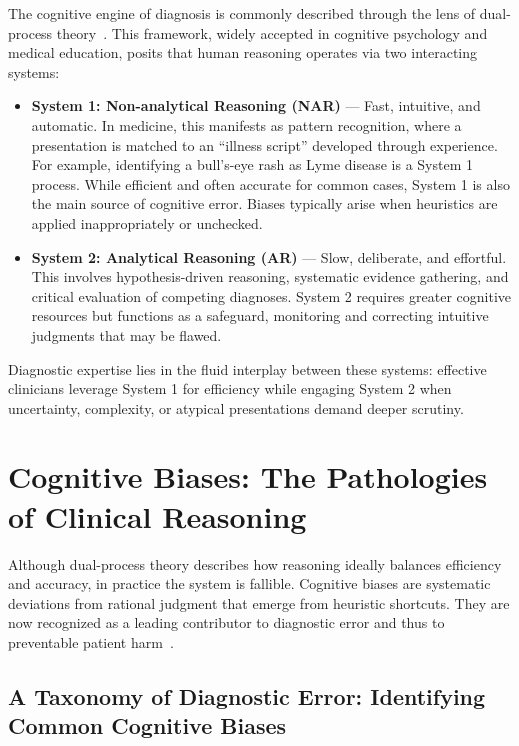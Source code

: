 The cognitive engine of diagnosis is commonly described through the lens of dual-process theory~\parencite{berge_cognitive_2013}. This framework, widely accepted in cognitive psychology and medical education, posits that human reasoning operates via two interacting systems:

\begin{itemize}
\item \textbf{System 1: Non-analytical Reasoning (NAR)} --- Fast, intuitive, and automatic. In medicine, this manifests as pattern recognition, where a presentation is matched to an ``illness script'' developed through experience. For example, identifying a bull's-eye rash as Lyme disease is a System 1 process. While efficient and often accurate for common cases, System 1 is also the main source of cognitive error. Biases typically arise when heuristics are applied inappropriately or unchecked.

\item \textbf{System 2: Analytical Reasoning (AR)} --- Slow, deliberate, and effortful. This involves hypothesis-driven reasoning, systematic evidence gathering, and critical evaluation of competing diagnoses. System 2 requires greater cognitive resources but functions as a safeguard, monitoring and correcting intuitive judgments that may be flawed.
\end{itemize}

Diagnostic expertise lies in the fluid interplay between these systems: effective clinicians leverage System 1 for efficiency while engaging System 2 when uncertainty, complexity, or atypical presentations demand deeper scrutiny.

\section{Cognitive Biases: The Pathologies of Clinical Reasoning}

Although dual-process theory describes how reasoning ideally balances efficiency and accuracy, in practice the system is fallible. Cognitive biases are systematic deviations from rational judgment that emerge from heuristic shortcuts. They are now recognized as a leading contributor to diagnostic error and thus to preventable patient harm~\parencite{graber_diagnostic_2005}.

\subsection{A Taxonomy of Diagnostic Error: Identifying Common Cognitive Biases}

